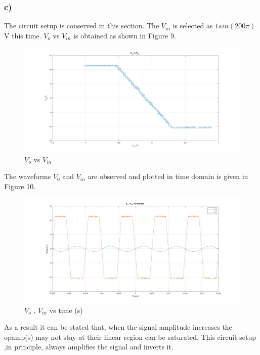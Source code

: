 \documentclass[letterpaper,12pt]{article}
\begin{document}
\subsubsection{c)}
The circuit setup is conserved in this section. The \(V_{in}\) is selected as \(1sin(200\pi)\) V this time. \(V_{o}\) vs \(V_{in}\) is obtained as shown in Figure 9.
\begin{figure}[H]
	\centering
   \includegraphics[width=1\textwidth]{1c_1.png}
   \caption{\(V_{o}\) vs \(V_{in}\)}
\end{figure}
The waveforms \(V_0\) and \(V_{in}\) are observed and plotted in time domain is given in Figure 10.
\begin{figure}[H]
	\centering
   \includegraphics[width=1\textwidth]{1c_2.png}
   \caption{\(V_{o}\) , \(V_{in}\) vs time (s) }
\end{figure}
As a result it can be stated that, when the signal amplitude increases the opamp(s) may not stay at their linear region can be saturated. This circuit setup ,in principle, always amplifies the signal and inverts it.
\end{document}
